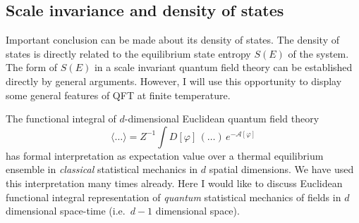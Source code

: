 \subsection*{Scale invariance and density of states}

Important conclusion can be made about its density of states. The density of
states is directly related to the equilibrium state entropy $S(E)$ of the system.
The form of $S(E)$ in a scale invariant quantum field theory can be established
directly by general arguments. However, I will use this opportunity to display some
general features of QFT at finite temperature.

The functional integral of $d$-dimensional Euclidean quantum field theory
\[
\langle\dots\rangle=Z^{-1}\int D[\varphi]\,(\dots)\,e^{-\mathcal A[\varphi]}
\]
has formal interpretation as expectation value over a thermal equilibrium ensemble
in \emph{classical} statistical mechanics in $d$ spatial dimensions. We have used
this interpretation many times already. Here I would like to discuss Euclidean
functional integral representation of \emph{quantum} statistical mechanics of
fields in $d$ dimensional space-time (i.e.\ $d-1$ dimensional space).

